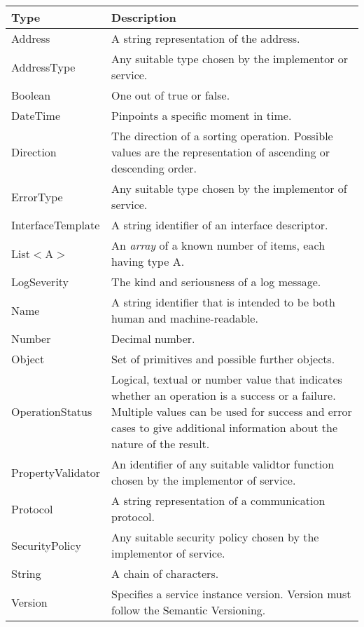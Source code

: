 \documentclass[a4paper]{arrowhead}
\newcommand{\pdef}[1]{{\textcolor{ArrowheadGrey}{#1\label{sec:model:primitives:#1}\label{sec:model:primitives:#1s}\label{sec:model:primitives:#1es}}}}
\begin{document}
\begin{table}[ht!]
\begin{tabularx}{\textwidth}{| p{3cm} | X |} \hline
\rowcolor{gray!33} Type & Description \\ \hline
\pdef{Address}          & A string representation of the address. \\ \hline
\pdef{AddressType}      & Any suitable type chosen by the implementor or service. \\ \hline
\pdef{Boolean}          & One out of true or false. \\ \hline
\pdef{DateTime}         & Pinpoints a specific moment in time. \\ \hline
\pdef{Direction}        & The direction of a sorting operation. Possible values are the representation of ascending or descending order. \\ \hline
\pdef{ErrorType}        & Any suitable type chosen by the implementor of service. \\ \hline
\pdef{InterfaceTemplate} & A string identifier of an interface descriptor. \\ \hline
\pdef{List}$<$A$>$      & An \textit{array} of a known number of items, each having type A. \\ \hline
\pdef{LogSeverity}      & The kind and seriousness of a log message. \\ \hline
\pdef{Name}             & A string identifier that is intended to be both human and machine-readable. \\ \hline
\pdef{Number}           & Decimal number. \\ \hline
\pdef{Object}           & Set of primitives and possible further objects. \\ \hline
\pdef{OperationStatus}  & Logical, textual or number value that indicates whether an operation is a success or a failure. Multiple values can be used for success and error cases to give additional information about the nature of the result. \\ \hline
\pdef{PropertyValidator} & An identifier of any suitable validtor function chosen by the implementor of service. \\ \hline
\pdef{Protocol}         & A string representation of a communication protocol. \\ \hline
\pdef{SecurityPolicy}   & Any suitable security policy chosen by the implementor of service. \\ \hline
\pdef{String}           & A chain of characters. \\ \hline
\pdef{Version}          & Specifies a service instance version. Version must follow the Semantic Versioning. \\ \hline
\end{tabularx}
\end{table}
\end{document}
